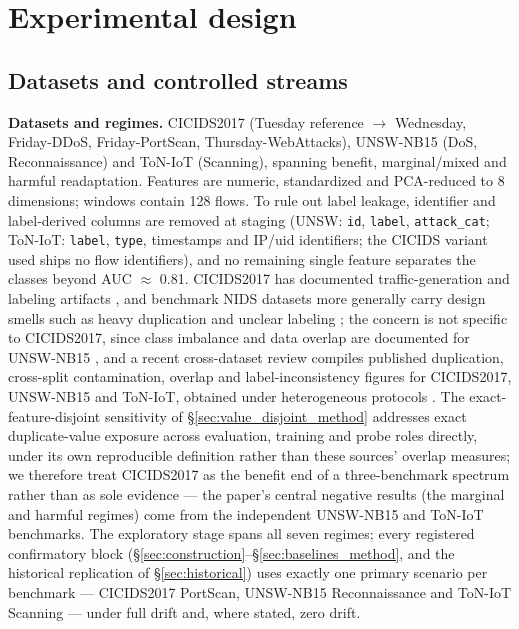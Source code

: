 \documentclass[journal]{IEEEtran}
\begin{document}
\section{Experimental design}


\subsection{Datasets and controlled streams}


\textbf{Datasets and regimes.} CICIDS2017 \cite{sharafaldin2018toward} (Tuesday reference $\to$ Wednesday, Friday-DDoS, Friday-PortScan, Thursday-WebAttacks), UNSW-NB15 \cite{moustafa2015unsw} (DoS, Reconnaissance) and ToN-IoT \cite{alsaedi2020toniot} (Scanning), spanning benefit, marginal/mixed and harmful readaptation. Features are numeric, standardized and PCA-reduced to 8 dimensions; windows contain 128 flows. To rule out label leakage, identifier and label-derived columns are removed at staging (UNSW: \texttt{id}, \texttt{label}, \texttt{attack\_cat}; ToN-IoT: \texttt{label}, \texttt{type}, timestamps and IP/uid identifiers; the CICIDS variant used ships no flow identifiers), and no remaining single feature separates the classes beyond AUC $\approx$ 0.81. CICIDS2017 has documented traffic-generation and labeling artifacts \cite{engelen2021troubleshooting,lanvin2022errors}, and benchmark NIDS datasets more generally carry design smells such as heavy duplication and unclear labeling \cite{flood2024smells}; the concern is not specific to CICIDS2017, since class imbalance and data overlap are documented for UNSW-NB15 \cite{zoghi2024unsw}, and a recent cross-dataset review compiles published duplication, cross-split contamination, overlap and label-inconsistency figures for CICIDS2017, UNSW-NB15 and ToN-IoT, obtained under heterogeneous protocols \cite{aburomman2026automl}. The exact-feature-disjoint sensitivity of \S\ref{sec:value_disjoint_method} addresses exact duplicate-value exposure across evaluation, training and probe roles directly, under its own reproducible definition rather than these sources' overlap measures; we therefore treat CICIDS2017 as the benefit end of a three-benchmark spectrum rather than as sole evidence --- the paper's central negative results (the marginal and harmful regimes) come from the independent UNSW-NB15 and ToN-IoT benchmarks. The exploratory stage spans all seven regimes; every registered confirmatory block (\S\ref{sec:construction}--\S\ref{sec:baselines_method}, and the historical replication of \S\ref{sec:historical}) uses exactly one primary scenario per benchmark --- CICIDS2017 PortScan, UNSW-NB15 Reconnaissance and ToN-IoT Scanning --- under full drift and, where stated, zero drift.
\end{document}
